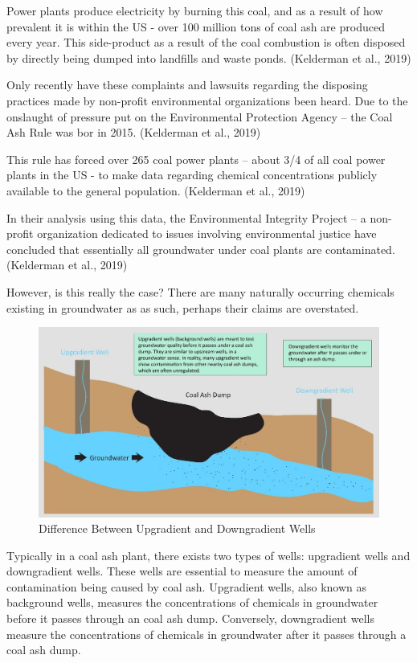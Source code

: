 \documentclass[12pt, twoside]{amherstthesis}
\begin{document}
Power plants produce electricity by burning this coal, and as a result of how prevalent it is within the US - over 100 million tons of coal ash are produced every year. This side-product as a result of the coal combustion is often disposed by directly being dumped into landfills and waste ponds. (Kelderman et al., 2019)

Only recently have these complaints and lawsuits regarding the disposing practices made by non-profit environmental organizations been heard. Due to the onslaught of pressure put on the Environmental Protection Agency -- the Coal Ash Rule was bor in 2015. (Kelderman et al., 2019)

This rule has forced over 265 coal power plants -- about 3/4 of all coal power plants in the US - to make data regarding chemical concentrations publicly available to the general population. (Kelderman et al., 2019)

In their analysis using this data, the Environmental Integrity Project -- a non-profit organization dedicated to issues involving environmental justice have concluded that essentially all groundwater under coal plants are contaminated. (Kelderman et al., 2019)

However, is this really the case? There are many naturally occurring chemicals existing in groundwater as as such, perhaps their claims are overstated.
\begin{figure}

{\centering \includegraphics[width=1\linewidth]{figures/upgradientdowngradient} 

}

\caption{Difference Between Upgradient and Downgradient Wells}\label{fig:upgradientdowngradient}
\end{figure}
Typically in a coal ash plant, there exists two types of wells: upgradient wells and downgradient wells. These wells are essential to measure the amount of contamination being caused by coal ash. Upgradient wells, also known as background wells, measures the concentrations of chemicals in groundwater before it passes through an coal ash dump. Conversely, downgradient wells measure the concentrations of chemicals in groundwater after it passes through a coal ash dump.
\end{document}
